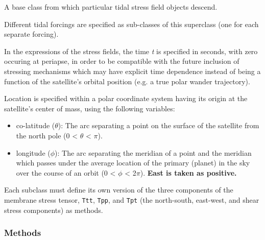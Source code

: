 A base class from which particular tidal stress field objects descend.

Different tidal forcings are specified as sub-classes of this superclass 
(one for each separate forcing).

In the expressions of the stress fields, the time \textit{t} is specified 
in seconds, with zero occuring at periapse, in order to be compatible with 
the future inclusion of stressing mechanisms which may have explicit time 
dependence instead of being a function of the satellite's orbital position 
(e.g. a true polar wander trajectory).

Location is specified within a polar coordinate system having its origin at
the satellite's center of mass, using the following variables:

\begin{itemize}
\setlength{\parskip}{0.6ex}
  \item co-latitude (\(\theta\)): The arc separating a point on the surface of 
    the satellite from the north pole (0 {\textless} \(\theta\) {\textless}
    \(\pi\)).

  \item longitude (\(\phi\)): The arc separating the meridian of a point and 
    the meridian which passes under the average location of the primary 
    (planet) in the sky over the course of an orbit (0 {\textless} \(\phi\)
    {\textless} 2\(\pi\)). \textbf{East is taken as positive.}

\end{itemize}

Each subclass must define its own version of the three components of the 
membrane stress tensor, \texttt{Ttt}, \texttt{Tpp}, and \texttt{Tpt} (the 
north-south, east-west, and shear stress components) as methods.



  \subsubsection{Methods}

    \label{satstress:SatStress:StressDef:calcLove}

